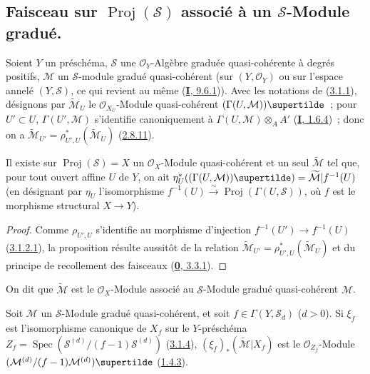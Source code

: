 \subsection{Faisceau sur $\operatorname{Proj}(\mathcal{S})$ associé à un
$\mathcal{S}$-Module gradué.}
\label{subsection:II.3.2-fr}

\begin{env}[3.2.1]
\label{II.3.2.1-fr}
Soient $Y$ un préschéma, $\mathcal{S}$ une $\mathcal{O}_Y$-Algèbre graduée
quasi-cohérente à degrés positifs, $\mathcal{M}$ un $\mathcal{S}$-module
gradué quasi-cohérent (sur $(Y,\mathcal{O}_Y)$ ou sur l'espace annelé
$(Y,\mathcal{S})$, ce qui revient au même
(\hyperref[I.9.6.1-fr]{\textbf{I}, 9.6.1})). Avec les notations de
(\hyperref[II.3.1.1-fr]{3.1.1}), désignons par $\widetilde{\mathcal{M}}_U$ le
$\mathcal{O}_{X_U}$-Module quasi-cohérent
$(\Gamma(U,\mathcal{M}))\supertilde$~; pour $U'\subset U$,
$\Gamma(U',\mathcal{M})$ s'identifie canoniquement à
$\Gamma(U,\mathcal{M})\otimes_A A'$ (\hyperref[I.1.6.4-fr]{\textbf{I}, 1.6.4})~; donc
on a $\widetilde{\mathcal{M}}_{U'}
=\rho_{U',U}^*(\widetilde{\mathcal{M}}_U)$
(\hyperref[II.2.8.11-fr]{2.8.11}).
\end{env}

\begin{proposition}[3.2.2]
\label{II.3.2.2-fr}
Il existe sur $\operatorname{Proj}(\mathcal{S})=X$ un
$\mathcal{O}_X$-Module quasi-cohérent et un seul $\widetilde{\mathcal{M}}$ tel
que, pour tout ouvert affine $U$ de $Y$, on ait
$\eta_U^*((\Gamma(U,\mathcal{M}))\supertilde)
=\widetilde{\mathcal{M}}|f^{-1}(U)$
(en désignant par $\eta_U$ l'isomorphisme
$f^{-1}(U)\xrightarrow{\sim}\operatorname{Proj}(\Gamma(U,\mathcal{S}))$, où
$f$ est le morphisme structural $X\to Y$).
\end{proposition}

\begin{proof}
Comme $\rho_{U',U}$ s'identifie au morphisme d'injection
$f^{-1}(U')\to f^{-1}(U)$ (\hyperref[II.3.1.2.1-fr]{3.1.2.1}), la proposition
résulte aussitôt de la relation
$\widetilde{\mathcal{M}}_{U'}=\rho_{U',U}^*(\widetilde{\mathcal{M}}_U)$ et du
principe de recollement des faisceaux (\hyperref[0.3.3.1-fr]{\textbf{0}, 3.3.1}).
\end{proof}

On dit que $\widetilde{\mathcal{M}}$ est le $\mathcal{O}_X$-Module associé au
$\mathcal{S}$-Module gradué quasi-cohérent $\mathcal{M}$.

\begin{proposition}[3.2.3]
\label{II.3.2.3-fr}
Soit $\mathcal{M}$ un $\mathcal{S}$-Module gradué quasi-cohérent, et soit
$f\in\Gamma(Y,\mathcal{S}_d)$ ($d>0$). Si $\xi_f$ est l'isomorphisme canonique
de $X_f$ sur le $Y$-préschéma
$Z_f=\operatorname{Spec}(\mathcal{S}^{(d)}/(f-1)\mathcal{S}^{(d)})$
\textup{(\hyperref[II.3.1.4-fr]{3.1.4})}, $(\xi_f)_*(\widetilde{\mathcal{M}}|X_f)$ est
le $\mathcal{O}_{Z_f}$-Module
$(\mathcal{M}^{(d)}/(f-1)\mathcal{M}^{(d)})\supertilde$
\textup{(\hyperref[II.1.4.3-fr]{1.4.3})}.
\end{proposition}

